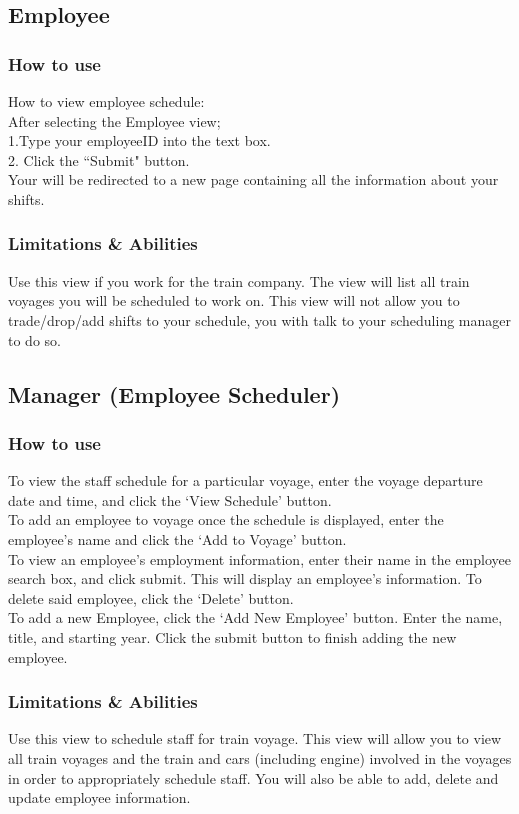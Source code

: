 \documentclass[letter]{article}
\begin{document}
\subsection{Employee}
\subsubsection{How to use}
How to view employee schedule:\\
After selecting the Employee view;\\ 
1.Type your employeeID into the text box.\\
2. Click the ``Submit" button. \\
Your will be redirected to a new page containing all the information about your shifts. \\


\subsubsection{Limitations \& Abilities}
Use this view if you work for the train company. The view will list all train voyages you will be scheduled to work on.  This view will not allow you to trade/drop/add shifts to your schedule, you with talk to your scheduling manager  to do so.


\subsection{Manager (Employee Scheduler)}
\subsubsection{How to use}
To view the staff schedule for a particular voyage, enter the voyage departure date and time, and click the `View Schedule' button. \\
To add an employee to voyage once the schedule is displayed, enter the employee's name and click the `Add to Voyage' button. \\
To view an employee's employment information, enter their name in the employee search box, and click submit. This will display an employee's information. To delete said employee, click the `Delete' button. \\
To add a new Employee, click the `Add New Employee' button. Enter the name, title, and starting year. Click the submit button to finish adding the new employee.

\subsubsection{Limitations \& Abilities}
Use this view to schedule staff for train voyage. This view will allow you to view all train voyages and the train and cars (including engine) involved in the voyages in order to appropriately schedule staff. You will also be able to add, delete and update employee information.
\end{document}
